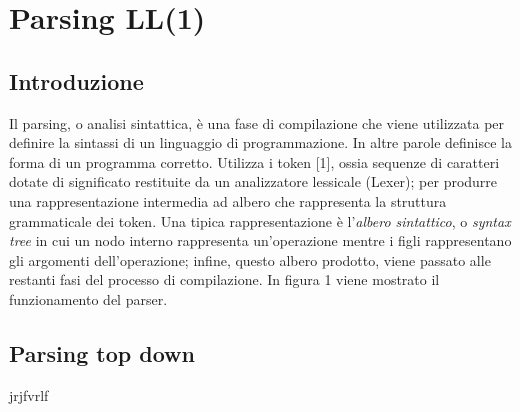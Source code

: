 \chapter{Parsing LL(1)}
\section{Introduzione}
Il parsing, o analisi sintattica, è una fase di compilazione  che viene utilizzata per definire la sintassi di un linguaggio di programmazione. In altre parole definisce la forma di un programma corretto. Utilizza i token [1], ossia sequenze di caratteri dotate di significato restituite da un analizzatore lessicale (Lexer); per produrre una rappresentazione intermedia ad albero che rappresenta la struttura grammaticale dei token. Una tipica rappresentazione è l'\textit{albero sintattico}, o \textit{syntax tree} in cui un nodo interno rappresenta un'operazione mentre i figli rappresentano gli argomenti dell'operazione; infine, questo albero prodotto, viene passato alle restanti fasi del processo di compilazione. In figura 1 viene mostrato il funzionamento del parser.
\par
\vspace{0.5cm}	
\section{Parsing top down}
jrjfvrlf